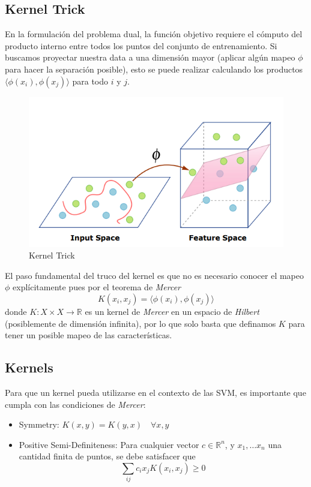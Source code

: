 \subsection{Kernel Trick}

En la formulación del problema dual, la función objetivo requiere el cómputo del producto interno entre todos los puntos del conjunto de entrenamiento. Si buscamos proyectar nuestra data a una dimensión mayor (aplicar algún mapeo $\phi$ para hacer la separación posible), esto se puede realizar calculando los productos $ \langle \phi(x_i) , \phi(x_j) \rangle $ para todo $i$ y $j$.

\begin{figure}[H]
    \center
    \includegraphics[scale=0.5]{notebooks/ML/img/kernel_trick.png}
    \caption{Kernel Trick}
\end{figure}

El paso fundamental del truco del kernel es que no es necesario conocer el mapeo $\phi$ explícitamente pues por el teorema de \textit{Mercer}
$$
K(x_i , x_j) = \langle \phi(x_i) , \phi(x_j) \rangle
$$
donde $K: X \times X \rightarrow \mathbb{R} $ es un kernel de \textit{Mercer} en un espacio de \textit{Hilbert} (posiblemente de dimensión infinita), por lo que solo basta que definamos $K$ para tener un posible mapeo de las características. 

\subsection{Kernels}

Para que un kernel pueda utilizarse en el contexto de las SVM, es importante que cumpla con las condiciones de \textit{Mercer}: 
\begin{itemize}
    \item Symmetry: $K(x,y) = K(y,x) \quad \forall x,y$ 
    \item Positive Semi-Definiteness: Para cualquier vector $c \in \mathbb{R}^n$, y $x_1 , \dots x_n$ una cantidad finita de puntos, se debe satisfacer que  
    $$\sum_{ij}c_ix_jK(x_i,x_j) \geq 0$$
\end{itemize}


